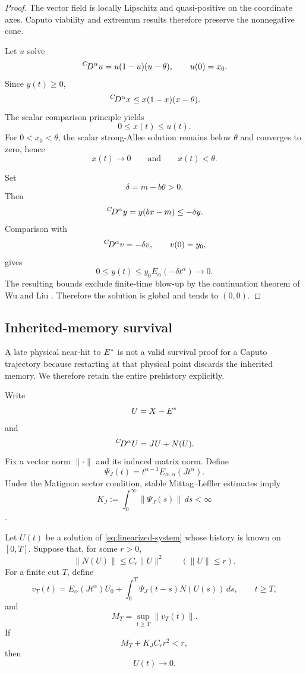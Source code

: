 \begin{proof}
The vector field is locally Lipschitz and quasi-positive on the coordinate axes. Caputo viability and extremum results
\cite{GirejkoMozyrskaWyrwas2011Viability,AlRefai2012ExtremePoints}
therefore preserve the nonnegative cone.

Let \(u\) solve
\[
  \,{}^{C}\!D^{\alpha} u=u(1-u)(u-\theta),
  \qquad
  u(0)=x_0.
\]
Since \(y(t)\ge0\),
\[
  \,{}^{C}\!D^{\alpha} x
  \le
  x(1-x)(x-\theta).
\]
The scalar comparison principle \cite{Wu2020Comparison} yields
\[
  0\le x(t)\le u(t).
\]
For \(0<x_0<\theta\), the scalar strong-Allee solution remains below \(\theta\) and converges to zero, hence
\[
  x(t)\to0
  \qquad\text{and}\qquad
  x(t)<\theta.
\]

Set
\[
  \delta=m-b\theta>0.
\]
Then
\[
  \,{}^{C}\!D^{\alpha} y
  =
  y(bx-m)
  \le
  -\delta y.
\]
Comparison with
\[
  \,{}^{C}\!D^{\alpha} v=-\delta v,
  \qquad
  v(0)=y_0,
\]
gives
\[
  0\le y(t)\le y_0E_\alpha(-\delta t^\alpha)\to0.
\]
The resulting bounds exclude finite-time blow-up by the continuation theorem of Wu and Liu
\cite{WuLiu2020Continuation}. Therefore the solution is global and tends to \((0,0)\).
\end{proof}

\subsection{Inherited-memory survival}

A late physical near-hit to \(E^{*}\) is not a valid survival proof for a Caputo trajectory because restarting at that physical point discards the inherited memory. We therefore retain the entire prehistory explicitly.

Write
\[
  U=X-E^{*}
\]
and
\begin{equation}
  \,{}^{C}\!D^{\alpha} U=JU+N(U).
  \label{eq:linearized-system}
\end{equation}
Fix a vector norm \(\|\cdot\|\) and its induced matrix norm. Define
\[
  \Psi_J(t)
  =
  t^{\alpha-1}E_{\alpha,\alpha}(Jt^\alpha).
\]
Under the Matignon sector condition, stable Mittag--Leffler estimates imply
\[
  K_J
  :=
  \int_0^\infty\|\Psi_J(s)\|\,ds
  <\infty
\]
\cite{CongDoanTuan2017Perron,CongTuanTrinh2020Asymptotic,Becker2011WeaklySingularResolvents}.

\begin{theorem}
\label{thm:memory-tail}
Let \(U(t)\) be a solution of \eqref{eq:linearized-system} whose history is known on \([0,T]\). Suppose that, for some \(r>0\),
\[
  \|N(U)\|
  \le
  C_r\|U\|^2
  \qquad
  (\|U\|\le r).
\]
For a finite cut \(T\), define
\begin{equation}
  v_T(t)
  =
  E_\alpha(Jt^\alpha)U_0
  +
  \int_0^T
  \Psi_J(t-s)N(U(s))\,ds,
  \qquad t\ge T,
  \label{eq:memory-response}
\end{equation}
and
\[
  M_T
  =
  \sup_{t\ge T}\|v_T(t)\|.
\]
If
\begin{equation}
  M_T+K_JC_rr^2<r,
  \label{eq:M1}
\end{equation}
then
\[
  U(t)\to0.
\]
\end{theorem}

